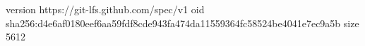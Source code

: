 version https://git-lfs.github.com/spec/v1
oid sha256:d4e6af0180eef6aa59fdf8cde943fa474da11559364fc58524be4041e7ec9a5b
size 5612
